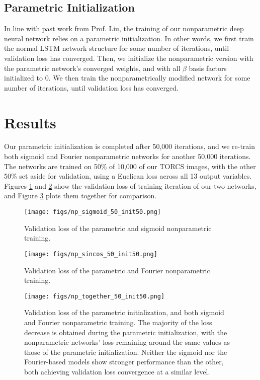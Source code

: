 \documentclass[master]{subfiles}
\begin{document}
\subsection{Parametric Initialization}
In line with past work from Prof. Liu, the training of our nonparametric deep neural network relies on a parametric initialization.  In other words, we first train the normal LSTM network structure for some number of iterations, until validation loss has converged.  Then, we initialize the nonparametric version with the parametric network's converged weights, and with all $\beta$ basis factors initialized to 0.  We then train the nonparametrically modified network for some number of iterations, until validation loss has converged.
\section{Results}
Our parametric initialization is completed after 50,000 iterations, and we re-train both sigmoid and Fourier nonparametric networks for another 50,000 iterations.  The networks are trained on 50\% of 10,000 of our TORCS images, with the other 50\% set aside for validation, using a Eucliean loss across all 13 output variables.  Figures \ref{fig:sigmoid} and \ref{fig:sincos} show the validation loss of training iteration of our two networks, and Figure \ref{fig:np_result} plots them together for comparison.
\begin{figure}[H]
\centering
\texttt{[image: figs/np\_sigmoid\_50\_init50.png]}
\caption{Validation loss of the parametric and sigmoid nonparametric training.}
\label{fig:sigmoid}
\end{figure}
\begin{figure}[H]
\centering
\texttt{[image: figs/np\_sincos\_50\_init50.png]}
\caption{Validation loss of the parametric and Fourier nonparametric training.}
\label{fig:sincos}
\end{figure}
\begin{landscape}
 \begin{figure}
  \centering
  \texttt{[image: figs/np\_together\_50\_init50.png]}
\caption{Validation loss of the parametric initialization, and both sigmoid and Fourier nonparametric training.  The majority of the loss decrease is obtained during the parametric initialization, with the nonparametric networks' loss remaining around the same values as those of the parametric initialization.  Neither the sigmoid nor the Fourier-based models show stronger performance than the other, both achieving validation loss convergence at a similar level.}
 \label{fig:np_result}
 \end{figure}
\end{landscape}
\end{document}
